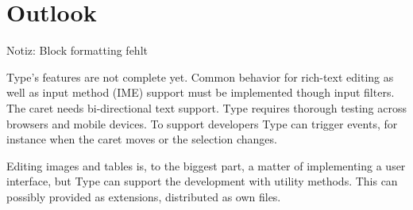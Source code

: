 




 
 



\section{Outlook}

Notiz: Block formatting fehlt

Type's features are not complete yet. Common behavior for rich-text editing as well as input method (IME) support must be implemented though input filters. The caret needs bi-directional text support. Type requires thorough testing across browsers and mobile devices. To support developers Type can trigger events, for instance when the caret moves or the selection changes.

Editing images and tables is, to the biggest part, a matter of implementing a user interface, but Type can support the development with utility methods. This can possibly provided as extensions, distributed as own files.



